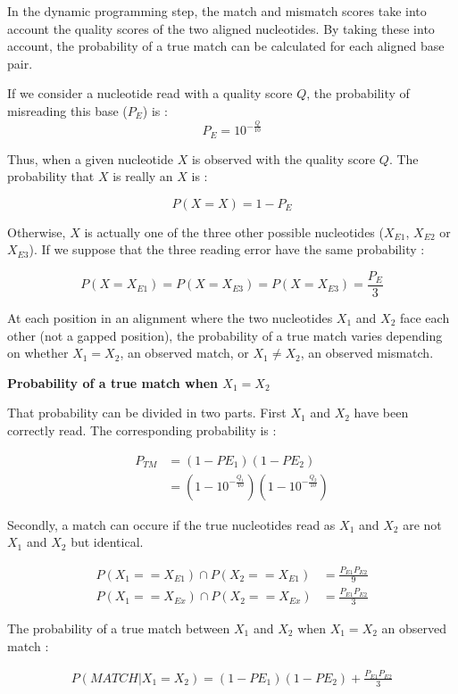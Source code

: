 \documentclass[
  letterpaper,
  DIV=11,
  numbers=noendperiod]{scrreprt}
\begin{document}
In the dynamic programming step, the match and mismatch scores take into
account the quality scores of the two aligned nucleotides. By taking
these into account, the probability of a true match can be calculated
for each aligned base pair.

If we consider a nucleotide read with a quality score \(Q\), the
probability of misreading this base (\(P_E\)) is : \[
P_E = 10^{-\frac{Q}{10}}
\]

Thus, when a given nucleotide \(X\) is observed with the quality score
\(Q\). The probability that \(X\) is really an \(X\) is :

\[
P(X=X) = 1 - P_E
\]

Otherwise, \(X\) is actually one of the three other possible nucleotides
(\(X_{E1}\), \(X_{E2}\) or \(X_{E3}\)). If we suppose that the three
reading error have the same probability :

\[
P(X=X_{E1}) = P(X=X_{E3}) = P(X=X_{E3}) = \frac{P_E}{3}
\]

At each position in an alignment where the two nucleotides \(X_1\) and
\(X_2\) face each other (not a gapped position), the probability of a
true match varies depending on whether \(X_1=X_2\), an observed match,
or \(X_1 \neq X_2\), an observed mismatch.

\textbf{Probability of a true match when \(X_1=X_2\)}

That probability can be divided in two parts. First \(X_1\) and \(X_2\)
have been correctly read. The corresponding probability is :

\[
\begin{aligned}
P_{TM} &= (1- PE_1)(1-PE_2)\\ 
       &=(1 - 10^{-\frac{Q_1}{10} } )(1 - 10^{-\frac{Q_2}{10}} )
\end{aligned}
\]

Secondly, a match can occure if the true nucleotides read as \(X_1\) and
\(X_2\) are not \(X_1\) and \(X_2\) but identical.

\[
\begin{aligned}
P(X_1==X_{E1}) \cap P(X_2==X_{E1}) &= \frac{P_{E1} P_{E2}}{9} \\
P(X_1==X_{Ex}) \cap P(X_2==X_{Ex}) & = \frac{P_{E1} P_{E2}}{3}
\end{aligned}
\]

The probability of a true match between \(X_1\) and \(X_2\) when
\(X_1 = X_2\) an observed match :

\[
\begin{aligned}
P(MATCH | X_1 = X_2) = (1- PE_1)(1-PE_2) + \frac{P_{E1} P_{E2}}{3}
\end{aligned}
\]
\end{document}
